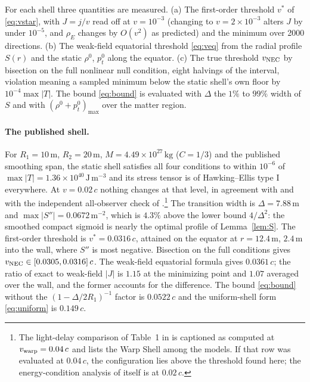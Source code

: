 \documentclass[11pt,a4paper]{article}
\theoremstyle{remark}
\begin{document}
For each shell three quantities are measured. (a) The first-order threshold $v^*$ of \eqref{eq:vstar}, with $J = j/v$ read off at $v = 10^{-3}$ (changing to $v = 2\times10^{-3}$ alters $J$ by under $10^{-5}$, and $\rho_E$ changes by $O(v^2)$ as predicted) and the minimum over 2000 directions. (b) The weak-field equatorial threshold \eqref{eq:veq} from the radial profile $S(r)$ and the static $\rho^0$, $p_t^0$ along the equator. (c) The true threshold $v_{\rm NEC}$ by bisection on the full nonlinear null condition, eight halvings of the interval, violation meaning a sampled minimum below the static shell's own floor by $10^{-4}\max|T|$. The bound \eqref{eq:bound} is evaluated with $\Delta$ the $1\%$ to $99\%$ width of $S$ and with $(\rho^0+p_t^0)_{\max}$ over the matter region.

\paragraph{The published shell.} For $R_1 = 10\,\mathrm{m}$, $R_2 = 20\,\mathrm{m}$, $M = 4.49\times10^{27}\,\mathrm{kg}$ ($C = 1/3$) and the published smoothing span, the static shell satisfies all four conditions to within $10^{-6}$ of $\max|T| = 1.36\times10^{40}\,\mathrm{J\,m^{-3}}$ and its stress tensor is of Hawking--Ellis type I everywhere. At $v = 0.02\,c$ nothing changes at that level, in agreement with \cite{Fuchs2024} and with the independent all-observer check of \cite{Le2026cert}.\footnote{The light-delay comparison of Table~1 in \cite{Fuchs2024} is captioned as computed at $v_{\rm warp} = 0.04\,c$ and lists the Warp Shell among the models. If that row was evaluated at $0.04\,c$, the configuration lies above the threshold found here; the energy-condition analysis of \cite{Fuchs2024} itself is at $0.02\,c$.} The transition width is $\Delta = 7.88\,\mathrm{m}$ and $\max|S''| = 0.0672\,\mathrm{m^{-2}}$, which is $4.3\%$ above the lower bound $4/\Delta^2$: the smoothed compact sigmoid is nearly the optimal profile of Lemma~\ref{lem:S}. The first-order threshold is $v^* = 0.0316\,c$, attained on the equator at $r = 12.4\,\mathrm{m}$, $2.4\,\mathrm{m}$ into the wall, where $S''$ is most negative. Bisection on the full conditions gives $v_{\rm NEC} \in [0.0305, 0.0316]\,c$. The weak-field equatorial formula gives $0.0361\,c$; the ratio of exact to weak-field $|J|$ is $1.15$ at the minimizing point and $1.07$ averaged over the wall, and the former accounts for the difference. The bound \eqref{eq:bound} without the $(1-\Delta/2R_1)^{-1}$ factor is $0.0522\,c$ and the uniform-shell form \eqref{eq:uniform} is $0.149\,c$.
\end{document}
